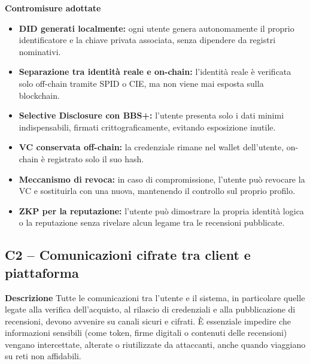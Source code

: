             \noindent \textbf{Contromisure adottate}
                \begin{itemize}
                    \item \textbf{DID generati localmente:} ogni utente genera autonomamente il proprio identificatore e la chiave privata associata, senza dipendere da registri nominativi.
                    
                    \item \textbf{Separazione tra identità reale e on-chain:} l'identità reale è verificata solo off-chain tramite SPID o CIE, ma non viene mai esposta sulla blockchain.
                    
                    \item \textbf{Selective Disclosure con BBS+:} l'utente presenta solo i dati minimi indispensabili, firmati crittograficamente, evitando esposizione inutile.
                    
                    \item \textbf{VC conservata off-chain:} la credenziale rimane nel wallet dell'utente, on-chain è registrato solo il suo hash.
                    
                    \item \textbf{Meccanismo di revoca:} in caso di compromissione, l'utente può revocare la VC e sostituirla con una nuova, mantenendo il controllo sul proprio profilo.
                    
                    \item \textbf{ZKP per la reputazione:} l'utente può dimostrare la propria identità logica o la reputazione senza rivelare alcun legame tra le recensioni pubblicate.
                \end{itemize}

        \subsection{C2 – Comunicazioni cifrate tra client e piattaforma}
            \noindent \textbf{Descrizione}
                Tutte le comunicazioni tra l'utente e il sistema, in particolare quelle legate alla verifica dell'acquisto, al rilascio di credenziali e alla pubblicazione di recensioni, devono avvenire su canali sicuri e cifrati. È essenziale impedire che informazioni sensibili (come token, firme digitali o contenuti delle recensioni) vengano intercettate, alterate o riutilizzate da attaccanti, anche quando viaggiano su reti non affidabili. \\
    
